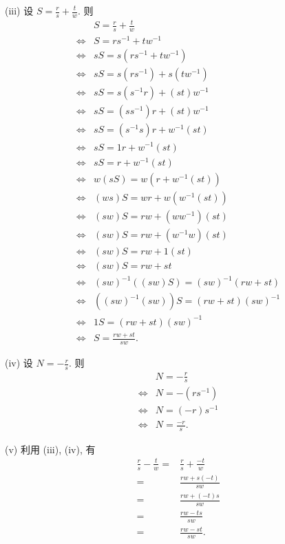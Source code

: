 \begin{pf}
    (iii) 设 $S = \frac{r}{s} + \frac{t}{w}$. 则
    \begin{align*}
                & S = \frac{r}{s} + \frac{t}{w}            \\
        \iff {} & S = rs^{-1} + tw^{-1}                    \\
        \iff {} & sS = s(rs^{-1} + tw^{-1})                \\
        \iff {} & sS = s(rs^{-1}) + s(tw^{-1})             \\
        \iff {} & sS = s(s^{-1}r) + (st)w^{-1}             \\
        \iff {} & sS = (ss^{-1}) r + (st) w^{-1}           \\
        \iff {} & sS = (s^{-1}s) r + w^{-1} (st)           \\
        \iff {} & sS = 1r + w^{-1} (st)                    \\
        \iff {} & sS = r + w^{-1} (st)                     \\
        \iff {} & w(sS) = w(r + w^{-1} (st))               \\
        \iff {} & (ws)S = wr + w(w^{-1} (st))              \\
        \iff {} & (sw)S = rw + (ww^{-1}) (st)              \\
        \iff {} & (sw)S = rw + (w^{-1}w) (st)              \\
        \iff {} & (sw)S = rw + 1(st)                       \\
        \iff {} & (sw)S = rw + st                          \\
        \iff {} & (sw)^{-1} ((sw) S) = (sw)^{-1} (rw + st) \\
        \iff {} & ((sw)^{-1} (sw)) S = (rw + st) (sw)^{-1} \\
        \iff {} & 1S = (rw + st)(sw)^{-1}                  \\
        \iff {} & S = \frac{rw + st}{sw}.
    \end{align*}

    (iv) 设 $N = -\frac{r}{s}$. 则
    \begin{align*}
                & N = -\frac{r}{s}  \\
        \iff {} & N = -(rs^{-1})    \\
        \iff {} & N = (-r)s^{-1}    \\
        \iff {} & N = \frac{-r}{s}.
    \end{align*}

    (v) 利用 (iii), (iv), 有
    \begin{align*}
        \frac{r}{s} - \frac{t}{w}
        = {} & \frac{r}{s} + \frac{-t}{w} \\
        = {} & \frac{rw + s(-t)}{sw}      \\
        = {} & \frac{rw + (-t)s}{sw}      \\
        = {} & \frac{rw - ts}{sw}         \\
        = {} & \frac{rw - st}{sw}.
    \end{align*}


\end{pf}
